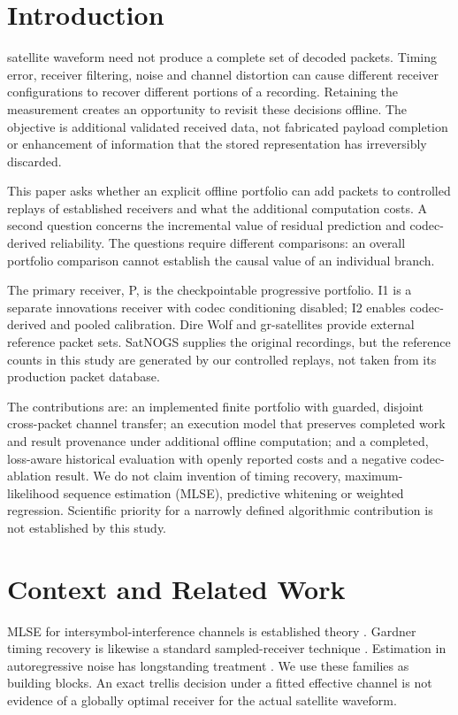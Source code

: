 \documentclass[journal]{IEEEtran}
\begin{document}
\section{Introduction}
 satellite waveform need not produce a complete set of decoded packets. Timing error, receiver filtering, noise and channel distortion can cause different receiver configurations to recover different portions of a recording. Retaining the measurement creates an opportunity to revisit these decisions offline. The objective is additional validated received data, not fabricated payload completion or enhancement of information that the stored representation has irreversibly discarded.

This paper asks whether an explicit offline portfolio can add packets to controlled replays of established receivers and what the additional computation costs. A second question concerns the incremental value of residual prediction and codec-derived reliability. The questions require different comparisons: an overall portfolio comparison cannot establish the causal value of an individual branch.

The primary receiver, P, is the checkpointable progressive portfolio. I1 is a separate innovations receiver with codec conditioning disabled; I2 enables codec-derived and pooled calibration. Dire Wolf and gr-satellites provide external reference packet sets. SatNOGS supplies the original recordings, but the reference counts in this study are generated by our controlled replays, not taken from its production packet database.

The contributions are: an implemented finite portfolio with guarded, disjoint cross-packet channel transfer; an execution model that preserves completed work and result provenance under additional offline computation; and a completed, loss-aware historical evaluation with openly reported costs and a negative codec-ablation result. We do not claim invention of timing recovery, maximum-likelihood sequence estimation (MLSE), predictive whitening or weighted regression. Scientific priority for a narrowly defined algorithmic contribution is not established by this study.

\section{Context and Related Work}
MLSE for intersymbol-interference channels is established theory \cite{forney1972}. Gardner timing recovery is likewise a standard sampled-receiver technique \cite{gardner1986}. Estimation in autoregressive noise has longstanding treatment \cite{kay1994}. We use these families as building blocks. An exact trellis decision under a fitted effective channel is not evidence of a globally optimal receiver for the actual satellite waveform.
\end{document}
